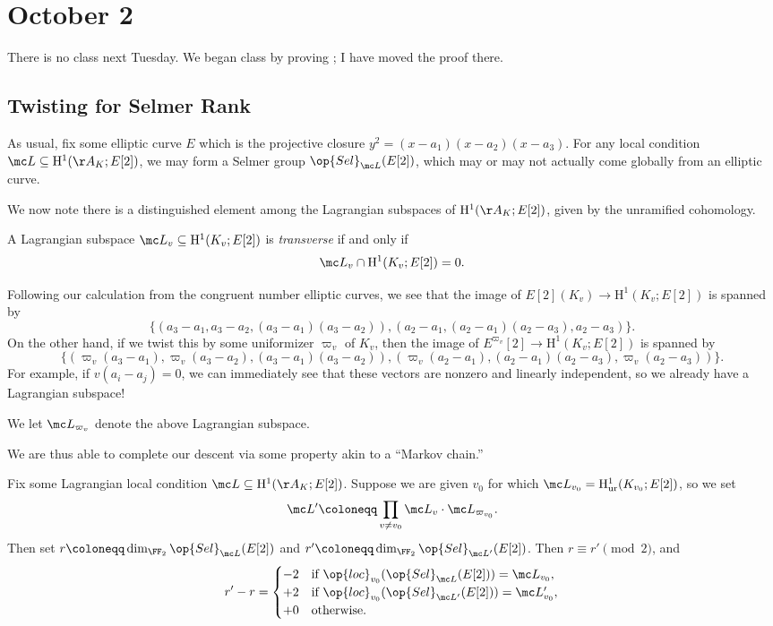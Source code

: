 \documentclass[../notes.tex]{subfiles}
\begin{document}
\section{October 2}
There is no class next Tuesday. We began class by proving ; I have moved the proof there.

\subsection{Twisting for Selmer Rank}
As usual, fix some elliptic curve $E$ which is the projective closure $y^2=(x-a_1)(x-a_2)(x-a_3)$. For any local condition $\mc L\subseteq\mathrm H^1(\AA_K;E[2])$, we may form a Selmer group $\op{Sel}_{\mc L}(E[2])$, which may or may not actually come globally from an elliptic curve.

We now note there is a distinguished element among the Lagrangian subspaces of $\mathrm H^1(\AA_K;E[2])$, given by the unramified cohomology.
\begin{definition}[transverse]
	A Lagrangian subspace $\mc L_v\subseteq\mathrm H^1(K_v;E[2])$ is \textit{transverse} if and only if
	\[\mc L_v\cap\mathrm H^1(K_v;E[2])=0.\]
\end{definition}
Following our calculation from the congruent number elliptic curves, we see that the image of $E[2](K_v)\to\mathrm H^1(K_v;E[2])$ is spanned by
\[\{(a_3-a_1,a_3-a_2,(a_3-a_1)(a_3-a_2)),(a_2-a_1,(a_2-a_1)(a_2-a_3),a_2-a_3)\}.\]
On the other hand, if we twist this by some uniformizer $\varpi_v$ of $K_v$, then the image of $E^{\varpi_v}[2]\to\mathrm H^1(K_v;E[2])$ is spanned by
\[\{(\varpi_v(a_3-a_1),\varpi_v(a_3-a_2),(a_3-a_1)(a_3-a_2)),(\varpi_v(a_2-a_1),(a_2-a_1)(a_2-a_3),\varpi_v(a_2-a_3))\}.\]
For example, if $v(a_i-a_j)=0$, we can immediately see that these vectors are nonzero and linearly independent, so we already have a Lagrangian subspace!
\begin{notation}
	We let $\mc L_{\varpi_v}$ denote the above Lagrangian subspace.
\end{notation}
We are thus able to complete our descent via some property akin to a ``Markov chain.''
\begin{theorem} \label{prop:selmer-as-markov}
	Fix some Lagrangian local condition $\mc L\subseteq\mathrm H^1(\AA_K;E[2])$. Suppose we are given $v_0$ for which $\mc L_{v_0}=\mathrm H^1_{\mathrm{ur}}(K_{v_0};E[2])$, so we set
	\[\mc L'\coloneqq\prod_{v\ne v_0}\mc L_v\cdot\mc L_{\varpi_{v_0}}.\]
	Then set $r\coloneqq\dim_{\FF_2}\op{Sel}_{\mc L}(E[2])$ and $r'\coloneqq\dim_{\FF_2}\op{Sel}_{\mc L'}(E[2])$. Then $r\equiv r'\pmod2$, and
	\[r'-r=\begin{cases}
		-2 & \text{if }\op{loc}_{v_0}(\op{Sel}_{\mc L}(E[2]))=\mc L_{v_0}, \\
		+2 & \text{if }\op{loc}_{v_0}(\op{Sel}_{\mc L'}(E[2]))=\mc L'_{v_0}, \\
		+0 & \text{otherwise}.
	\end{cases}\]
\end{theorem}
\end{document}
